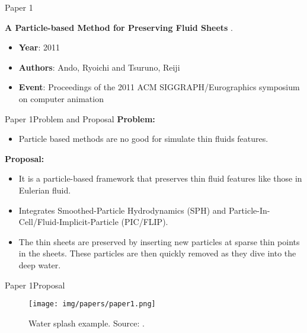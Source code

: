 \documentclass[10pt]{beamer}
\newcommand{\1}{
        	\setbeamertemplate{background}{
        		\texttt{[image: img/1]}
        		\tikz[overlay] \fill[fill opacity=0.75,fill=white] (0,0) rectangle (-\paperwidth,\paperheight);
        	}
}
\begin{document}
\begin{frame}{Paper 1}{}
	
	\begin{block}{}
		\centering
		\textbf{A Particle-based Method for Preserving Fluid Sheets} \cite{ando2011particle}.
	\end{block}

	\begin{itemize}
		\item \textbf{Year}: 2011
		\item \textbf{Authors}: Ando, Ryoichi and Tsuruno, Reiji
		\item \textbf{Event}: Proceedings of the 2011 ACM SIGGRAPH/Eurographics symposium on computer animation
	\end{itemize}
\end{frame}

\begin{frame}{Paper 1}{Problem and Proposal}
	\textbf{Problem:}	
	\begin{itemize}
		\item Particle based methods are no good for simulate thin fluids features.
	\end{itemize}
	
	\textbf{Proposal:}
	\begin{itemize}
		\item It is a particle-based framework that preserves thin fluid features like those in Eulerian fluid.
		\item Integrates Smoothed-Particle Hydrodynamics (SPH) and Particle-In-Cell/Fluid-Implicit-Particle (PIC/FLIP).
		\item The thin sheets are preserved by inserting new particles at sparse thin points in the sheets. These particles are then quickly removed as they
		dive into the deep water.
	\end{itemize}

\end{frame}


\begin{frame}{Paper 1}{Proposal}
	\begin{figure}
		\centering
		\texttt{[image: img/papers/paper1.png]}
		\caption{Water splash example. Source: \cite{ando2011particle}.}
	\end{figure}
\end{frame}
\end{document}
